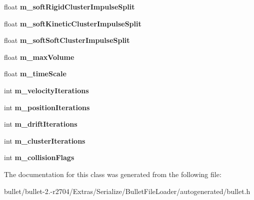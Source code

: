 \begin{DoxyCompactItemize}
\item 
\hypertarget{class_bullet_1_1_soft_body_config_data_aa24ff37db1aa4fc37f0240c69659d927}{float {\bfseries m\+\_\+soft\+Rigid\+Cluster\+Impulse\+Split}}\label{class_bullet_1_1_soft_body_config_data_aa24ff37db1aa4fc37f0240c69659d927}

\item 
\hypertarget{class_bullet_1_1_soft_body_config_data_a78bcb22888ebbb61367e710f039a1c7b}{float {\bfseries m\+\_\+soft\+Kinetic\+Cluster\+Impulse\+Split}}\label{class_bullet_1_1_soft_body_config_data_a78bcb22888ebbb61367e710f039a1c7b}

\item 
\hypertarget{class_bullet_1_1_soft_body_config_data_aef83d73ff51306677091c36c2716172a}{float {\bfseries m\+\_\+soft\+Soft\+Cluster\+Impulse\+Split}}\label{class_bullet_1_1_soft_body_config_data_aef83d73ff51306677091c36c2716172a}

\item 
\hypertarget{class_bullet_1_1_soft_body_config_data_a0f5ad818d5be66f1cdb4f5fbfa8d0d44}{float {\bfseries m\+\_\+max\+Volume}}\label{class_bullet_1_1_soft_body_config_data_a0f5ad818d5be66f1cdb4f5fbfa8d0d44}

\item 
\hypertarget{class_bullet_1_1_soft_body_config_data_a87eb218f8034beb00e5bf5e4ea00f6ec}{float {\bfseries m\+\_\+time\+Scale}}\label{class_bullet_1_1_soft_body_config_data_a87eb218f8034beb00e5bf5e4ea00f6ec}

\item 
\hypertarget{class_bullet_1_1_soft_body_config_data_a9e5bbbed52d261db6088116d1c9afeac}{int {\bfseries m\+\_\+velocity\+Iterations}}\label{class_bullet_1_1_soft_body_config_data_a9e5bbbed52d261db6088116d1c9afeac}

\item 
\hypertarget{class_bullet_1_1_soft_body_config_data_a4a2a52a02affc273a43d63f27084769b}{int {\bfseries m\+\_\+position\+Iterations}}\label{class_bullet_1_1_soft_body_config_data_a4a2a52a02affc273a43d63f27084769b}

\item 
\hypertarget{class_bullet_1_1_soft_body_config_data_a0e596d050c081417fda9849eec7fab94}{int {\bfseries m\+\_\+drift\+Iterations}}\label{class_bullet_1_1_soft_body_config_data_a0e596d050c081417fda9849eec7fab94}

\item 
\hypertarget{class_bullet_1_1_soft_body_config_data_aca13d880b0a2d82263e81b642be12b3c}{int {\bfseries m\+\_\+cluster\+Iterations}}\label{class_bullet_1_1_soft_body_config_data_aca13d880b0a2d82263e81b642be12b3c}

\item 
\hypertarget{class_bullet_1_1_soft_body_config_data_ad21496fdf633ebf6354558672af62506}{int {\bfseries m\+\_\+collision\+Flags}}\label{class_bullet_1_1_soft_body_config_data_ad21496fdf633ebf6354558672af62506}

\end{DoxyCompactItemize}


The documentation for this class was generated from the following file\+:\begin{DoxyCompactItemize}
\item 
bullet/bullet-\/2.-\/r2704/\+Extras/\+Serialize/\+Bullet\+File\+Loader/autogenerated/bullet.\+h\end{DoxyCompactItemize}
